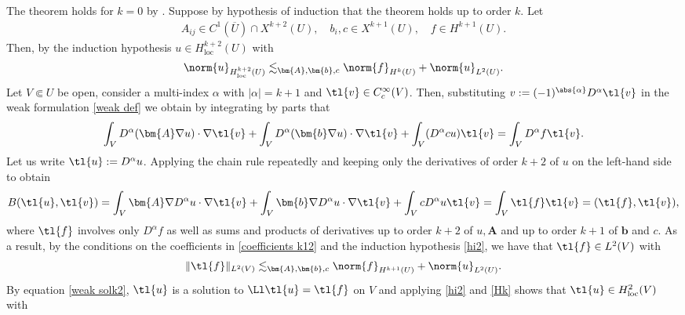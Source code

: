 \documentclass[
    a4paper,
    DIV=14,
    abstract=true,
    numbers=noenddot
]{scrartcl}
\begin{document}
\begin{hint}
    The theorem holds for $k=0$ by .
    Suppose by hypothesis of induction that the theorem holds up to order $k$. Let
    \begin{align}\label{coefficients k12}
        A_{ij} \in C^{1}(\overline{U} )\cap X^{k+2}(U), \quad b_i,c \in X^{k+1}(U), \quad f \in H^{k+1}(U).
    \end{align}
    Then, by the induction hypothesis $u \in H^{k+2}_{\mathrm{loc}} (U)$ with
    \begin{align}\label{hi2}
        \norm{u}_{H^{k+2}_{\mathrm{loc}}(U)} \lesssim_{\bm{A},\bm{b},c} \norm{f}_{H^k(U)}+\norm{u}_{L^2(U)}.
    \end{align}
    Let $V\Subset U$ be open, consider a multi-index $\alpha$ with $|\alpha|=k+1$ and $\tl{v } \in C_c^\infty(V)$. Then, substituting  $v := (-1)^{\abs{\alpha} } D^\alpha \tl{v}$ in the weak formulation \eqref{weak def} we obtain by integrating by parts that
    \begin{align*}
        \int_{V} D^\alpha(\bm{A} \nabla u) \cdot \nabla \tl{v} +\int_{V} D^\alpha(\bm{b} \nabla u) \cdot \nabla \tl{v} +\int_{V} (D^\alpha c u) \tl{v} =\int_{V} D^\alpha f \tl{v}.
    \end{align*}
    Let us write $\tl{u}:= D^\alpha u $. Applying the chain rule repeatedly and keeping only the derivatives of order $k+2$ of $u$ on the left-hand side to obtain
    \begin{align}\label{weak solk2}
        B(\tl{u},\tl{v} ) = \int_{V} \bm{A} \nabla D^\alpha u \cdot \nabla \tl{v} +\int_{V} \bm{b} \nabla D^\alpha u \cdot \nabla \tl{v} +\int_{V} c D^\alpha u \tl{v} =\int_{V} \tl{f} \tl{v}= (\tl{f} ,\tl{v}),
    \end{align}
    where $\tl{f}$ involves only $D^\alpha f$ as well as sums and products of derivatives up to order $k+2$ of $u,\bm{A}$ and up to order $k+1$ of $ \bm{b}$ and $c$. As a result, by the conditions on the coefficients in \eqref{coefficients k12} and the induction hypothesis \eqref{hi2}, we have that $\tl{f} \in L^2(V)$ with
    \begin{align}\label{Hk}
        \|{\tl{f}}\|_{L^2(V)} \lesssim_{\bm{A},\bm{b},c} \norm{f}_{H^{k+1}(U)}+\norm{u}_{L^2(U)}.
    \end{align}
    By equation \eqref{weak solk2}, $\tl{u}$ is a solution to $\Ll \tl{u}=\tl{f}   $  on $V$ and applying \eqref{hi2}  and \eqref{Hk} shows that $\tl{u} \in H^{2} _{\mathrm{loc}}(V)$ with
    \begin{align*}

\end{align*}
\end{hint}
\end{document}

